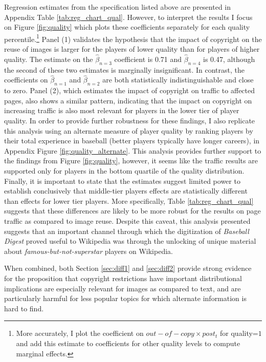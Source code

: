 \documentclass[11pt]{article}
\begin{document}
Regression estimates from the specification listed above are presented in Appendix Table \ref{tab:reg_chart_qual}. However, to interpret the results I focus on Figure \ref{fig:quality} which plots these coefficients separately for each quality percentile.\footnote{More accurately, I plot the coefficient on $out-of-copy \times post_t$ for quality=$1$ and add this estimate to coefficients for other quality levels to compute marginal effects.} Panel (1) validates the hypothesis that the impact of copyright on the reuse of images is larger for the players of lower quality than for players of higher quality. The estimate on the $\hat{\beta}_{n=3}$ coefficient is 0.71 and $\hat{\beta}_{n=4}$ is 0.47, although the second of these two estimates is marginally insignificant. In contrast, the coefficients on $\hat{\beta}_{n=1}$ and $\hat{\beta}_{n=2}$ are both statistically indistinguishable and close to zero. Panel (2), which estimates the impact of copyright on traffic to affected pages, also shows a similar pattern, indicating that the impact on copyright on increasing traffic is also most relevant for players in the lower tier of player quality. In order to provide further robustness for these findings, I also replicate this analysis using an alternate measure of player quality by ranking players by their total experience in baseball (better players typically have longer careers), in Appendix Figure \ref{fig:quality_alternate}. This analysis provides further support to the findings from Figure \ref{fig:quality}, however, it seems like the traffic results are supported only for players in the bottom quartile of the quality distribution. Finally, it is important to state that the estimates suggest limited power to establish conclusively that middle-tier players effects are statistically different than effects for lower tier players. More specifically, Table \ref{tab:reg_chart_qual} suggests that these differences are likely to be more robust for the results on page traffic as compared to image reuse.  Despite this caveat, this analysis presented suggests that an important channel through which the digitization of \emph{Baseball Digest} proved useful to Wikipedia was through the unlocking of unique material about \emph{famous-but-not-superstar} players on Wikipedia. 

When combined, both Section \ref{sec:diff1} and \ref{sec:diff2} provide strong evidence for the proposition that copyright restrictions have important distributional implications are especially relevant for images as compared to text, and are particularly harmful for less popular topics for which alternate information is hard to find. 
\end{document}
